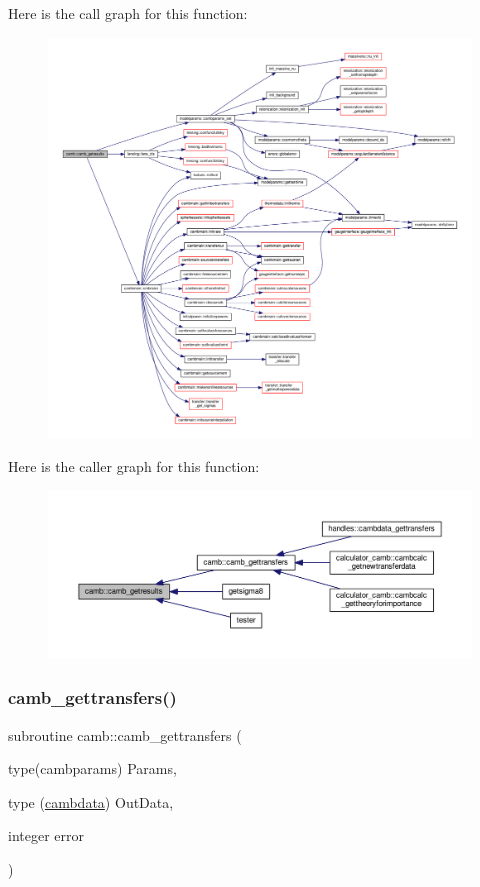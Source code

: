 Here is the call graph for this function\+:
\nopagebreak
\begin{figure}[H]
\begin{center}
\leavevmode
\includegraphics[width=350pt]{namespacecamb_af6f4c73133d3de79ac10db3c4b2d0650_cgraph}
\end{center}
\end{figure}
Here is the caller graph for this function\+:
\nopagebreak
\begin{figure}[H]
\begin{center}
\leavevmode
\includegraphics[width=350pt]{namespacecamb_af6f4c73133d3de79ac10db3c4b2d0650_icgraph}
\end{center}
\end{figure}
\mbox{\label{namespacecamb_ae587b573e03da5811edb59806305b2cd}} 
\subsubsection{\texorpdfstring{camb\+\_\+gettransfers()}{camb\_gettransfers()}}
{\footnotesize\ttfamily subroutine camb\+::camb\+\_\+gettransfers (\begin{DoxyParamCaption}\item[{type(cambparams)}]{Params,  }\item[{type (\mbox{\hyperlink{structcamb_1_1cambdata}{cambdata}})}]{Out\+Data,  }\item[{integer}]{error }\end{DoxyParamCaption})}



